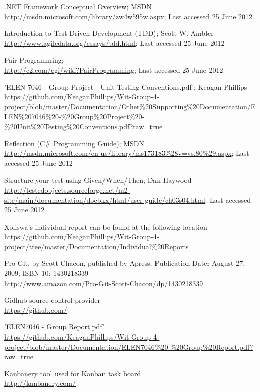 \documentclass[a4paper,12pt]{article}
\begin{document}
\clearpage
\begin{thebibliography}{5}
 .NET Framework Conceptual Overview; MSDN\\ \url{http://msdn.microsoft.com/library/zw4w595w.aspx}; Last accessed 25 June 2012

 Introduction to Test Driven Development (TDD); Scott W. Ambler\\ \url{http://www.agiledata.org/essays/tdd.html}; Last accessed 25 June 2012

 Pair Programming; \\ \url{http://c2.com/cgi/wiki?PairProgramming}; Last accessed 25 June 2012

 'ELEN 7046 - Group Project - Unit Testing Conventions.pdf'; Keagan Phillips \\ \url{https://github.com/KeaganPhillips/Wit-Group-4-project/blob/master/Documentation/Other%20Supporting%20Documentation/ELEN%207046%20-%20Group%20Project%20-%20Unit%20Testing%20Conventions.pdf?raw=true}

 Reflection (C\# Programming Guide); MSDN\\ \url{http://msdn.microsoft.com/en-us/library/ms173183%28v=vs.80%29.aspx}; Last accessed 25 June 2012

 Structure your test using Given/When/Then; Dan Haywood\\ \url{http://testedobjects.sourceforge.net/m2-site/main/documentation/docbkx/html/user-guide/ch03s04.html}; Last accessed 25 June 2012

 Xoliswa's individual report can be found at the following location\\ \url{https://github.com/KeaganPhillips/Wit-Group-4-project/tree/master/Documentation/Individual%20Reports}

 Pro Git, by Scott Chacon, published by Apress; Publication Date: August 27, 2009; ISBN-10: 1430218339 \\ \url{http://www.amazon.com/Pro-Git-Scott-Chacon/dp/1430218339}

 Gidhub source control provider\\ \url{https://github.com/}

 'ELEN7046 - Group Report.pdf'\\ \url{https://github.com/KeaganPhillips/Wit-Group-4-project/blob/master/Documentation/ELEN7046%20-%20Group%20Report.pdf?raw=true}

 Kanbanery tool used for Kanban task board\\ \url{http://kanbanery.com/}

\end{thebibliography}

 
\end{document}
